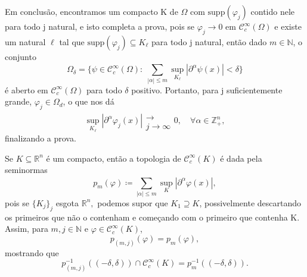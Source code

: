 \documentclass[../distribution_theory_notes.tex]{subfiles}
\begin{document}
\begin{proof*}
                        Em conclusão, encontramos um compacto K de \(\Omega \) com \(\mathrm{supp}(\varphi_{j})\) contido nele para todo j natural, e isto completa a prova, pois se \(\varphi_{j}\rightarrow 0\) em \(\mathcal{C}_{c}^{\infty}(\Omega )\) e existe um natural \(\ell \) tal que \(\mathrm{supp}(\varphi_{j})\subseteq K_{\ell}\) para todo j natural, então dado \(m\in \mathbb{N}\), o conjunto 
                          \[
                            \Omega_{\delta }=\{\psi \in \mathcal{C}_{c}^{\infty}(\Omega ):\; \sum\limits_{|\alpha |\leq m}^{}\sup_{K_{\ell}}|\partial^{\alpha }\psi (x)|<\delta \}
                          \]
                          é aberto em \(\mathcal{C}_{c}^{\infty}(\Omega )\) para todo \(\delta \) positivo. Portanto, para j suficientemente grande, \(\varphi_{j}\in \Omega_d\), o que nos dá 
                            \[
                              \sup_{K_{\ell}}| \partial ^{\alpha }\varphi_{j}(x)|\substack{ \\ \longrightarrow \\ j\to \infty}0, \quad \forall \alpha \in \mathbb{Z}_{+}^{n},
                            \]
                            finalizando a prova. \qedsymbol
   \end{proof*}
    \begin{tcolorbox}[
    skin=enhanced,
    title=Observação,
    fonttitle=\bfseries,
  colframe=black,
    colbacktitle=cyan!75!white, 
    colback=cyan!15,
    colbacklower=black,
  coltitle=black,
    drop fuzzy shadow,
    ]
    Se \(K\subseteq \mathbb{R}^{n}\) é um compacto, então a topologia de \(\mathcal{C}_{c}^{\infty}(K)\) é dada pela seminormas 
      \[
        p_{m}(\varphi )\coloneqq \sum\limits_{|\alpha |\leq m}^{}\sup_{K} |\partial^{\alpha }\varphi (x)|,
      \]
      pois se \(\{K_{j}\}_{j}\) esgota \(\mathbb{R}^{n},\) podemos supor que \(K_1\supseteq K\), possivelmente descartando os primeiros que não o contenham e começando com o primeiro que contenha K. Assim, para \(m, j\in \mathbb{N}\) e \(\varphi \in \mathcal{C}_{c}^{\infty}(K)\), 
        \[
          p_{(m, j)}(\varphi )=p_{m}(\varphi),
        \]
        mostrando que 
          \[
            p_{(m, j)}^{-1}((-\delta, \delta ))\cap \mathcal{C}_{c}^{\infty}(K)=p_{m}^{-1}((-\delta , \delta )).
          \]
    \end{tcolorbox}
\end{document}

